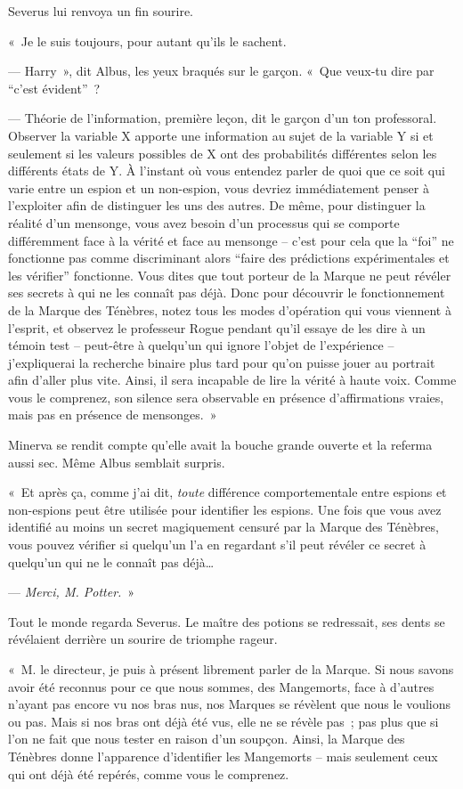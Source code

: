 Severus lui renvoya un fin sourire.

«~Je le suis toujours, pour autant qu'ils le sachent.

--- Harry~», dit Albus, les yeux braqués sur le garçon. «~Que veux-tu dire par “c'est évident”~?

--- Théorie de l'information, première leçon, dit le garçon d'un ton professoral. Observer la variable X apporte une information au sujet de la variable Y si et seulement si les valeurs possibles de X ont des probabilités différentes selon les différents états de Y. À l'instant où vous entendez parler de quoi que ce soit qui varie entre un espion et un non-espion, vous devriez immédiatement penser à l'exploiter afin de distinguer les uns des autres. De même, pour distinguer la réalité d'un mensonge, vous avez besoin d'un processus qui se comporte différemment face à la vérité et face au mensonge -- c'est pour cela que la “foi” ne fonctionne pas comme discriminant alors “faire des prédictions expérimentales et les vérifier” fonctionne. Vous dites que tout porteur de la Marque ne peut révéler ses secrets à qui ne les connaît pas déjà. Donc pour découvrir le fonctionnement de la Marque des Ténèbres, notez tous les modes d'opération qui vous viennent à l'esprit, et observez le professeur Rogue pendant qu'il essaye de les dire à un témoin test -- peut-être à quelqu'un qui ignore l'objet de l'expérience -- j'expliquerai la recherche binaire plus tard pour qu'on puisse jouer au portrait afin d'aller plus vite. Ainsi, il sera incapable de lire la vérité à haute voix. Comme vous le comprenez, son silence sera observable en présence d'affirmations vraies, mais pas en présence de mensonges.~»

Minerva se rendit compte qu'elle avait la bouche grande ouverte et la referma aussi sec. Même Albus semblait surpris.

«~Et après ça, comme j'ai dit, \emph{toute} différence comportementale entre espions et non-espions peut être utilisée pour identifier les espions. Une fois que vous avez identifié au moins un secret magiquement censuré par la Marque des Ténèbres, vous pouvez vérifier si quelqu'un l'a en regardant s'il peut révéler ce secret à quelqu'un qui ne le connaît pas déjà…

--- \emph{Merci, M. Potter.}~»

Tout le monde regarda Severus. Le maître des potions se redressait, ses dents se révélaient derrière un sourire de triomphe rageur.

«~M. le directeur, je puis à présent librement parler de la Marque. Si nous savons avoir été reconnus pour ce que nous sommes, des Mangemorts, face à d'autres n'ayant pas encore vu nos bras nus, nos Marques se révèlent que nous le voulions ou pas. Mais si nos bras ont déjà été vus, elle ne se révèle pas~; pas plus que si l'on ne fait que nous tester en raison d'un soupçon. Ainsi, la Marque des Ténèbres donne l'apparence d'identifier les Mangemorts -- mais seulement ceux qui ont déjà été repérés, comme vous le comprenez.

